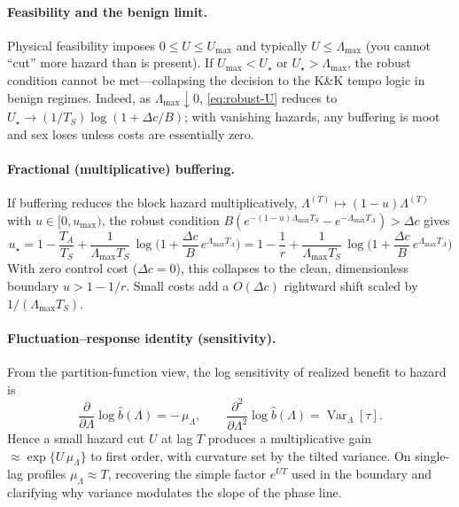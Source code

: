 \documentclass[11pt]{article}
\theoremstyle{upright}
\newcommand{\horizon}{\Lambda}
\newcommand{\Lmax}{\horizon^{(T)}_{\max}}
\newcommand{\hazT}[1]{\Lambda^{(#1)}}          %
\renewcommand{\Lmax}{\Lambda_{\max}}
\begin{document}
\paragraph{Feasibility and the benign limit.}
Physical feasibility imposes $0\le U\le U_{\max}$ and typically $U\le \Lmax$ (you cannot “cut” more hazard than is present). If $U_{\max}<U_\star$ or $U_\star>\Lmax$, the robust condition cannot be met—collapsing the decision to the K\&K tempo logic in benign regimes. Indeed, as $\Lmax\downarrow 0$, \eqref{eq:robust-U} reduces to $U_\star\to (1/T_S)\log(1+\Delta c/B)$; with vanishing hazards, any buffering is moot and sex loses unless costs are essentially zero.

\paragraph{Fractional (multiplicative) buffering.}
If buffering reduces the block hazard multiplicatively, $\hazT{T}\mapsto(1-u)\hazT{T}$ with $u\in[0,u_{\max})$, the robust condition $B(e^{-(1-u)\Lmax T_S}-e^{-\Lmax T_A})>\Delta c$ gives
\begin{equation}
\label{eq:robust-u}
\boxed{
u_\star = 1-\frac{T_A}{T_S} + \frac{1}{\Lmax T_S}\,\log\!\Big(1+\frac{\Delta c}{B}\,e^{\Lmax T_A}\Big)
= 1-\frac{1}{r} + \frac{1}{\Lmax T_S}\,\log\!\Big(1+\frac{\Delta c}{B}\,e^{\Lmax T_A}\Big)
}
\end{equation}
With zero control cost ($\Delta c=0$), this collapses to the clean, dimensionless boundary $u>1-1/r$. Small costs add a $O(\Delta c)$ rightward shift scaled by $1/(\Lmax T_S)$.

\paragraph{Fluctuation–response identity (sensitivity).}
From the partition-function view, the log sensitivity of realized benefit to hazard is
\[
\frac{\partial}{\partial \Lambda}\log \widehat b(\Lambda) = -\,\mu_\Lambda, \qquad
\frac{\partial^2}{\partial \Lambda^2}\log \widehat b(\Lambda)= \operatorname{Var}_\Lambda[\tau].
\]
Hence a small hazard cut $U$ at lag $T$ produces a multiplicative gain $\approx \exp\{U\,\mu_\Lambda\}$ to first order,
with curvature set by the tilted variance. On single-lag profiles $\mu_\Lambda\!\approx\!T$, recovering the simple factor
$e^{U T}$ used in the boundary and clarifying why variance modulates the slope of the phase line.
\end{document}
